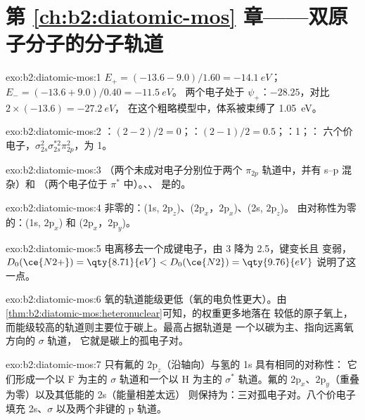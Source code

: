 \section*{第 \ref{ch:b2:diatomic-mos} 章——双原子分子的分子轨道}

\begin{solution}{exo:b2:diatomic-mos:1}
$E_+ = (-13.6 - 9.0)/1.60 = \qty{-14.1}{eV}$；$E_- = (-13.6 + 9.0)/0.40 = \qty{-11.5}{eV}$。
两个电子处于 $\psi_+$：$-28.25$，对比 $2 \times (-13.6) = \qty{-27.2}{eV}$，
在这个粗略模型中，体系被束缚了 \qty{1.05}{eV}。
\end{solution}

\begin{solution}{exo:b2:diatomic-mos:2}
：$(2 - 2)/2 = 0$；：$(2 - 1)/2 = 0.5$；：1；：
六个价电子，$\sigma_{2s}^2\sigma_{2s}^{*2}\pi_{2p}^2$，为 1。
\end{solution}

\begin{solution}{exo:b2:diatomic-mos:3}
（两个未成对电子分别位于两个 $\pi_{2p}$ 轨道中，并有 s--p 混杂）和
（两个电子位于 $\pi^*$ 中）。、、 是的。
\end{solution}

\begin{solution}{exo:b2:diatomic-mos:4}
非零的：(1s, $2\mathrm p_z$)、($2\mathrm p_x$，$2\mathrm p_x$)、(2s, $2\mathrm p_z$)。
由对称性为零的：(1s, $2\mathrm p_x$) 和 ($2\mathrm p_x$，$2\mathrm p_y$)。
\end{solution}

\begin{solution}{exo:b2:diatomic-mos:5}
电离移去一个成键电子，由 3 降为 2.5，键变长且
变弱，$D_0(\ce{N2+}) = \qty{8.71}{eV} < D_0(\ce{N2}) = \qty{9.76}{eV}$ 说明了这一点。
\end{solution}

\begin{solution}{exo:b2:diatomic-mos:6}
氧的轨道能级更低（氧的电负性更大）。由
\cref{thm:b2:diatomic-mos:heteronuclear}可知，的权重更多地落在
较低的原子氧上，而能级较高的轨道则主要位于碳上。最高占据轨道是
一个以碳为主、指向远离氧方向的 $\sigma$ 轨道，
它就是碳上的孤电子对。
\end{solution}

\begin{solution}{exo:b2:diatomic-mos:7}
只有氟的 $2\mathrm p_z$（沿轴向）与氢的 1s 具有相同的对称性：
它们形成一个以 F 为主的 $\sigma$ 轨道和一个以 H 为主的 $\sigma^*$ 轨道。氟的
$2\mathrm p_x$、$2\mathrm p_y$（重叠为零）以及其低能的 2s（能量相差太远）
则保持为：三对孤电子对。八个价电子填充 2s、$\sigma$
以及两个非键的 p 轨道。
\end{solution}

